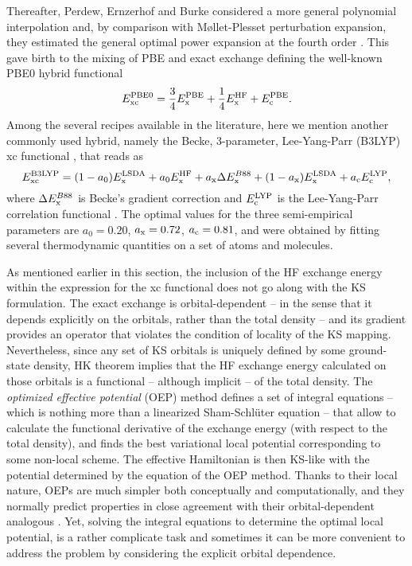 Thereafter, Perdew, Ernzerhof and Burke considered a more general polynomial interpolation and, by comparison with M\o{}llet-Plesset perturbation expansion, they estimated the general optimal power expansion at the fourth order \cite{perdew_rationale_1996}. This gave birth to the mixing of PBE and exact exchange defining the well-known PBE0 hybrid functional
%
\begin{equation}
    E_{\rm xc}^{\rm PBE0} = \frac{3}{4} E_{\rm x}^{\rm PBE} + \frac{1}{4} E_{\rm x}^{\rm HF} + E_{\rm c}^{\rm PBE} .
    \label{eq:pbe0-hybrid}
\end{equation}
%
Among the several recipes available in the literature, here we mention another commonly used hybrid, namely the Becke, 3-parameter, Lee-Yang-Parr (B3LYP) xc functional \cite{becke_densityfunctional_1993,stephens_ab_1994}, that reads as
%
\begin{equation}
    E_{\rm xc}^{\rm B3LYP} = (1-a_0) E_{\rm x}^{\rm LSDA} + a_0 E_{\rm x}^{\rm HF} + a_{\rm x} \Delta E_{\rm x}^{B88} + (1-a_{\rm x}) E_{\rm x}^{\rm LSDA} + a_{\rm c} E_{\rm c}^{\rm LYP} ,
    \label{eq:b3lyp-hybrid}
\end{equation}
%
where $\Delta E_{\rm x}^{B88}$ is Becke's gradient correction and $E_{\rm c}^{\rm LYP}$ is the Lee-Yang-Parr correlation functional \cite{lee_development_1988}. The optimal values for the three semi-empirical parameters are $a_0 = 0.20$, $a_{\rm x} = 0.72$, $a_{\rm c} = 0.81$, and were obtained by fitting several thermodynamic quantities on a set of atoms and molecules.

As mentioned earlier in this section, the inclusion of the HF exchange energy within the expression for the xc functional does not go along with the KS formulation. The exact exchange is orbital-dependent -- in the sense that it depends explicitly on the orbitals, rather than the total density -- and its gradient provides an operator that violates the condition of locality of the KS mapping. Nevertheless, since any set of KS orbitals is uniquely defined by some ground-state density, HK theorem implies that the HF exchange energy calculated on those orbitals is a functional -- although implicit -- of the total density. The \emph{optimized effective potential} (OEP) method \cite{sharp_variational_1953,talman_optimized_1976} defines a set of integral equations -- which is nothing more than a linearized Sham-Schl\"{u}ter equation \cite{sham_density-functional_1983} -- that allow to calculate the functional derivative of the exchange energy (with respect to the total density), and finds the best variational local potential corresponding to some non-local scheme. The effective Hamiltonian is then KS-like with the potential determined by the equation of the OEP method. Thanks to their local nature, OEPs are much simpler both conceptually and computationally, and they normally predict properties in close agreement with their orbital-dependent analogous \cite{kummel_orbital-dependent_2008}. Yet, solving the integral equations to determine the optimal local potential, is a rather complicate task and sometimes it can be more convenient to address the problem by considering the explicit orbital dependence.

